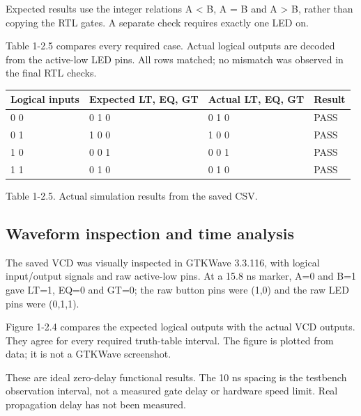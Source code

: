 \documentclass[10pt,a4paper]{article}
\begin{document}
Expected results use the integer relations A < B, A = B and A > B, rather than copying the RTL gates. A separate check requires exactly one LED on.\par

Table 1-2.5 compares every required case. Actual logical outputs are decoded from the active-low LED pins. All rows matched; no mismatch was observed in the final RTL checks.\par

\begingroup\small\setlength{\tabcolsep}{4pt}
\renewcommand{\arraystretch}{1.20}
\noindent\begin{tabular}{@{}p{}p{}p{}p{}@{}}
\toprule
\textbf{Logical inputs} & \textbf{Expected LT, EQ, GT} & \textbf{Actual LT, EQ, GT} & \textbf{Result} \\
\midrule
0 0 & 0 1 0 & 0 1 0 & PASS \\
0 1 & 1 0 0 & 1 0 0 & PASS \\
1 0 & 0 0 1 & 0 0 1 & PASS \\
1 1 & 0 1 0 & 0 1 0 & PASS \\
\bottomrule
\end{tabular}\par\endgroup
\vspace{2mm}

{\small\raggedright Table 1-2.5. Actual simulation results from the saved CSV.\par}

\subsection*{Waveform inspection and time analysis}

The saved VCD was visually inspected in GTKWave 3.3.116, with logical input/output signals and raw active-low pins. At a 15.8 ns marker, A=0 and B=1 gave LT=1, EQ=0 and GT=0; the raw button pins were (1,0) and the raw LED pins were (0,1,1).\par

Figure 1-2.4 compares the expected logical outputs with the actual VCD outputs. They agree for every required truth-table interval. The figure is plotted from data; it is not a GTKWave screenshot.\par

These are ideal zero-delay functional results. The 10 ns spacing is the testbench observation interval, not a measured gate delay or hardware speed limit. Real propagation delay has not been measured.\par
\end{document}
